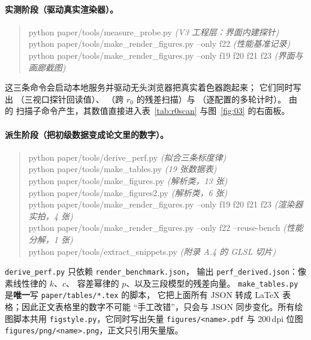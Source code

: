\paragraph{实测阶段（驱动真实渲染器）。}
\begin{quote}\ttfamily\small
python paper/tools/measure\_probe.py \hfill\emph{(V3 工程层：界面内建探针)}\\
python paper/tools/make\_render\_figures.py --only f22 \hfill\emph{(性能基准记录)}\\
python paper/tools/make\_render\_figures.py --only f19 f20 f21 f23 \hfill\emph{(界面与画廊截图)}
\end{quote}

\noindent 这三条命令会启动本地服务并驱动无头浏览器把真实着色器跑起来；
它们同时写出 （三视口探针回读值）、
（跨 $r_0$ 的残差扫描）与
（逐配置的多轮计时）。
 由  的
扫描子命令产生，其数值直接进入表~\ref{tab:r0scan} 与图~\ref{fig:03} 的右面板。

\paragraph{派生阶段（把初级数据变成论文里的数字）。}
\begin{quote}\ttfamily\small
python paper/tools/derive\_perf.py \hfill\emph{(拟合三条标度律)}\\
python paper/tools/make\_tables.py \hfill\emph{(19 张数据表)}\\
python paper/tools/make\_figures.py \hfill\emph{(解析类，13 张)}\\
python paper/tools/make\_figures2.py \hfill\emph{(解析类，6 张)}\\
python paper/tools/make\_render\_figures.py --only f19 f20 f21 f23 \hfill\emph{(渲染器实拍，4 张)}\\
python paper/tools/make\_render\_figures.py --only f22 --reuse-bench \hfill\emph{(性能分解，1 张)}\\
python paper/tools/extract\_snippets.py \hfill\emph{(附录 A.4 的 GLSL 切片)}
\end{quote}

\noindent \texttt{derive\_perf.py} 只依赖 \texttt{render\_benchmark.json}，
输出 \texttt{perf\_derived.json}：像素线性律的 $k$、$c$、
容差幂律的 $p$、以及三段模型的残差向量。
\texttt{make\_tables.py} 是\textbf{唯一}写 \texttt{paper/tables/*.tex} 的脚本，
它把上面所有 JSON 转成 \LaTeX{} 表格；因此正文表格里的数字不可能
“手工改错”，只会与 JSON 同步变化。所有绘图脚本共用
\texttt{figstyle.py}，它同时写出矢量
\texttt{figures/<name>.pdf} 与 200\,dpi 位图
\texttt{figures/png/<name>.png}，正文只引用矢量版。

